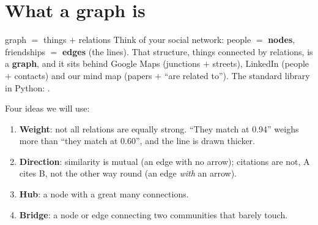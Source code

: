 \documentclass[11pt,a4paper]{article}
\begin{document}
\section{What a graph is}

\begin{concepto}{graph $=$ things $+$ relations}
Think of your social network: people $=$ \textbf{nodes}, friendships $=$ \textbf{edges} (the
lines). That structure, things connected by relations, is a \textbf{graph}, and it sits behind
Google Maps (junctions $+$ streets), LinkedIn (people $+$ contacts) and our mind map (papers
$+$ ``are related to''). The standard library in Python: .
\end{concepto}

Four ideas we will use:
\begin{enumerate}
  \item \textbf{Weight}: not all relations are equally strong. ``They match at 0.94'' weighs
        more than ``they match at 0.60'', and the line is drawn thicker.
  \item \textbf{Direction}: similarity is mutual (an edge with no arrow); citations are not,
        A cites B, not the other way round (an edge \emph{with} an arrow).
  \item \textbf{Hub}: a node with a great many connections.
  \item \textbf{Bridge}: a node or edge connecting two communities that barely touch.
\end{enumerate}

\begin{center}
\end{center}
\end{document}
